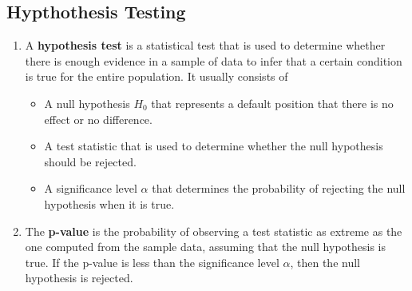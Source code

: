 \documentclass[letterpaper, 11pt]{article}
\newcommand{\1}{\mathds{1}}	%
\theoremstyle{definition}
\begin{document}
\subsection{Hypthothesis Testing}
\begin{enumerate}
    \item A \textbf{hypothesis test} is a statistical test that is used to determine whether there is enough evidence in a sample of data to infer that a certain condition is true for the entire population.
    It usually consists of 
    \begin{itemize}
        \item A null hypothesis $H_0$ that represents a default position that there is no effect or no difference.
        \item A test statistic that is used to determine whether the null hypothesis should be rejected.
        \item A significance level $\alpha$ that determines the probability of rejecting the null hypothesis when it is true.
    \end{itemize}
    \item The \textbf{p-value} is the probability of observing a test statistic as extreme as the one computed from the sample data, assuming that the null hypothesis is true. If the p-value is less than the significance level $\alpha$, then the null hypothesis is rejected.
\end{enumerate}
\end{document}
